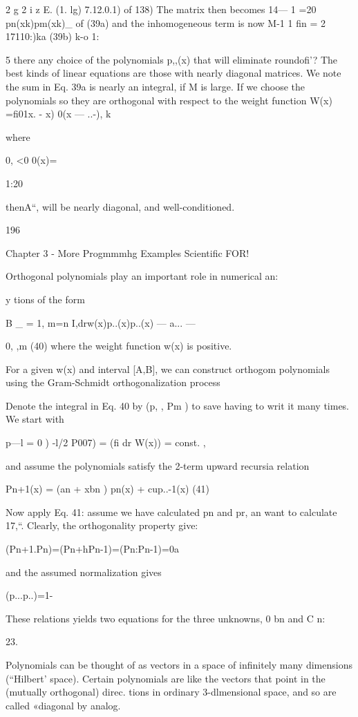 {{{{2 g 2 i
z E. (1. lg) 7.12.0.1) of 138)
The matrix then becomes
14— 1
=20 pn(xk)pm(xk)_ of (39a)
and the inhomogeneous term is now
M-1 1
ﬁn = 2 17110:)ka (39b)
k-o 1:

5 there any choice of the polynomials p,,(x) that will eliminate
roundoﬁ'? The best kinds of linear equations are those with
nearly diagonal matrices. We note the sum in Eq. 39a is nearly an
integral, if M is large. If we choose the polynomials so they are
orthogonal with respect to the weight function
W(x) =ﬁ01x. - x) 0(x — ..-),
k

where

0, <0
0(x)={1:20

thenA“, will be nearly diagonal, and well-conditioned.

196

Chapter 3 - More Progmmmhg Examples Scientiﬁc FOR!

Orthogonal polynomials play an important role in numerical an:

y%
tions of the form

B _ = 1, m=n
I,drw(x)p..(x)p..(x) — a... — {0, ,m (40)
where the weight function w(x) is positive.

For a given w(x) and interval [A,B], we can construct orthogom
polynomials using the Gram-Schmidt orthogonalization process

Denote the integral in Eq. 40 by (p, , Pm ) to save having to writ
it many times. We start with

p—l = 0 )
-l/2
P007) = (fi dr W(x)) = const. ,

and assume the polynomials satisfy the 2-term upward recursia
relation

Pn+1(x) = (an + xbn ) pn(x) + cup..-1(x) (41)

Now apply Eq. 41: assume we have calculated pn and pr, an
want to calculate 17,“. Clearly, the orthogonality property give:

(Pn+1.Pn)=(Pn+hPn-1)=(Pn:Pn-1)=0a

and the assumed normalization gives

(p...p..)=1-

These relations yields two equations for the three unknowns, 0
bn and C n:

 

23.

Polynomials can be thought of as vectors in a space of inﬁnitely many dimensions (“Hilbert'
space). Certain polynomials are like the vectors that point in the (mutually orthogonal) direc.
tions in ordinary 3-dlmensional space, and so are called «diagonal by analog.

}}}}}}
